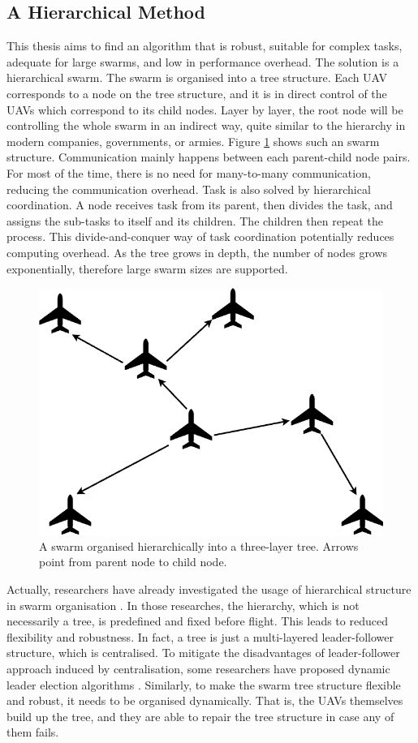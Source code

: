 \subsection{A Hierarchical Method}

This thesis aims to find an algorithm that is robust, suitable for complex tasks,
adequate for large swarms, and low in performance overhead.
The solution is a hierarchical swarm.
The swarm is organised into a tree structure.
Each UAV corresponds to a node on the tree structure,
and it is in direct control of the UAVs which correspond to its child nodes.
Layer by layer, the root node will be controlling the whole swarm in an indirect way,
quite similar to the hierarchy in modern companies, governments, or armies.
Figure \ref{fig:swarm_tree} shows such an swarm structure.
Communication mainly happens between each parent-child node pairs.
For most of the time, there is no need for many-to-many communication,
reducing the communication overhead.
Task is also solved by hierarchical coordination.
A node receives task from its parent, then divides the task,
and assigns the sub-tasks to itself and its children.
The children then repeat the process.
This divide-and-conquer way of task coordination potentially reduces computing overhead.
As the tree grows in depth, the number of nodes grows exponentially,
therefore large swarm sizes are supported.

\begin{figure}[htbp]
  \centering
  \includegraphics[width=0.4\linewidth]{rsc/swarm_tree.png}
  \caption[Hierarchical swarm.]
  {A swarm organised hierarchically into a three-layer tree.
  Arrows point from parent node to child node.}
  \label{fig:swarm_tree}
\end{figure}

Actually, researchers have already investigated the usage of hierarchical structure
in swarm organisation \parencite{CHEN2021, Wang2021, Tahir2020}.
In those researches, the hierarchy, which is not necessarily a tree,
is predefined and fixed before flight.
This leads to reduced flexibility and robustness.
In fact, a tree is just a multi-layered leader-follower structure, which is centralised.
To mitigate the disadvantages of leader-follower approach induced by centralisation,
some researchers have proposed dynamic leader election
algorithms \parencite{Ganesan2020, Brust2015}.
Similarly, to make the swarm tree structure flexible and robust,
it needs to be organised dynamically.
That is, the UAVs themselves build up the tree,
and they are able to repair the tree structure in case any of them fails.

